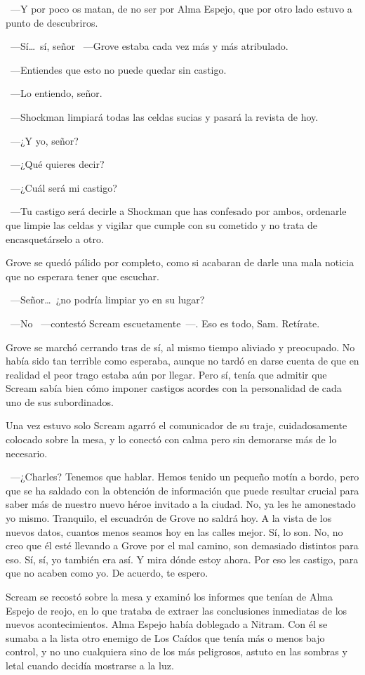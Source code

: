 ~---Y por poco os matan, de no ser por Alma Espejo, que por otro lado estuvo a punto de descubriros.

~---Sí\dots\ sí, señor ~---Grove estaba cada vez más y más atribulado.

~---Entiendes que esto no puede quedar sin castigo.

~---Lo entiendo, señor.

~---Shockman limpiará todas las celdas sucias y pasará la revista de hoy.

~---¿Y yo, señor?

~---¿Qué quieres decir?

~---¿Cuál será mi castigo?

~---Tu castigo será decirle a Shockman que has confesado por ambos, ordenarle que limpie las celdas y vigilar que cumple con su cometido y no trata de encasquetárselo a otro.

Grove se quedó pálido por completo, como si acabaran de darle una mala noticia que no esperara tener que escuchar.

~---Señor\dots\ ¿no podría limpiar yo en su lugar?

~---No ~---contestó Scream escuetamente~---. Eso es todo, Sam. Retírate.

Grove se marchó cerrando tras de sí, al mismo tiempo aliviado y preocupado. No había sido tan terrible como esperaba, aunque no tardó en darse cuenta de que en realidad el peor trago estaba aún por llegar. Pero sí, tenía que admitir que Scream sabía bien cómo imponer castigos acordes con la personalidad de cada uno de sus subordinados.

Una vez estuvo solo Scream agarró el comunicador de su traje, cuidadosamente colocado sobre la mesa, y lo conectó con calma pero sin demorarse más de lo necesario.

~---¿Charles? Tenemos que hablar. Hemos tenido un pequeño motín a bordo, pero que se ha saldado con la obtención de información que puede resultar crucial para saber más de nuestro nuevo héroe invitado a la ciudad. No, ya les he amonestado yo mismo. Tranquilo, el escuadrón de Grove no saldrá hoy. A la vista de los nuevos datos, cuantos menos seamos hoy en las calles mejor. Sí, lo son. No, no creo que él esté llevando a Grove por el mal camino, son demasiado distintos para eso. Sí, sí, yo también era así. Y mira dónde estoy ahora. Por eso les castigo, para que no acaben como yo. De acuerdo, te espero.

Scream se recostó sobre la mesa y examinó los informes que tenían de Alma Espejo de reojo, en lo que trataba de extraer las conclusiones inmediatas de los nuevos acontecimientos. Alma Espejo había doblegado a Nitram. Con él se sumaba a la lista otro enemigo de Los Caídos que tenía más o menos bajo control, y no uno cualquiera sino de los más peligrosos, astuto en las sombras y letal cuando decidía mostrarse a la luz.

